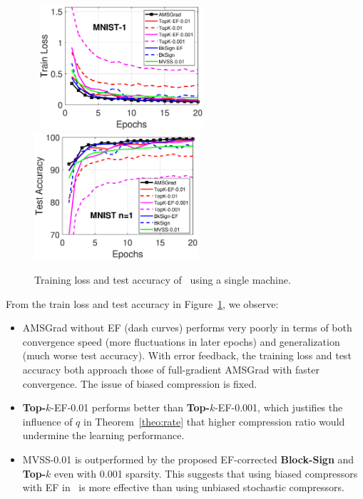 \documentclass[11pt]{article}
\begin{document}
\begin{figure}[H]
    \begin{center}
    \mbox{\hspace{-0.1in}
        \includegraphics[width=2.4in]{fig/mnist_cnn_train_loss_1_Qadamsign.eps}\hspace{-0.1in}
        \includegraphics[width=2.4in]{fig/mnist_cnn_test_accuracy_1_Qadamsign.eps}
    }
    \end{center}
	\caption{Training loss and test accuracy of \algo\ using a single machine.}
	\label{fig:mnist-1}
\end{figure}

From the train loss and test accuracy in Figure~\ref{fig:mnist-1}, we observe:
\begin{itemize}
    \item AMSGrad without EF (dash curves) performs very poorly in terms of both convergence speed (more fluctuations in later epochs) and generalization (much worse test accuracy). With error feedback, the training loss and test accuracy both approach those of full-gradient AMSGrad with faster convergence. The issue of biased compression is fixed.
    
    \item \textbf{Top-$k$}-EF-0.01 performs better than \textbf{Top-$k$}-EF-0.001, which justifies the influence of $q$ in Theorem~\ref{theo:rate} that higher compression ratio would undermine the learning performance.
    
    \item MVSS-0.01 is outperformed by the proposed EF-corrected \textbf{Block-Sign} and \textbf{Top-$k$} even with 0.001 sparsity. This suggests that using biased compressors with EF in \algo\ is more effective than using unbiased stochastic compressors.
\end{itemize}
\end{document}
